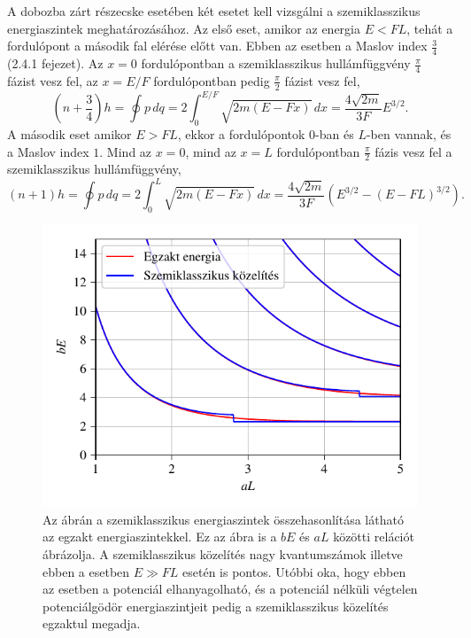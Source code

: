 A dobozba zárt részecske esetében két esetet kell vizsgálni a szemiklasszikus energiaszintek meghatározásához. Az első eset, amikor az energia $E < FL$, tehát a fordulópont a második fal elérése előtt van. Ebben az esetben a Maslov index $\frac{3}{4}$ \cite{brack:semiclassical} (2.4.1 fejezet). Az $x=0$ fordulópontban a szemiklasszikus hullámfüggvény $\frac{\pi}{4}$ fázist vesz fel, az $x=E/F$ fordulópontban pedig $\frac{\pi}{2}$ fázist vesz fel,
\begin{equation}
	\left(n+\frac{3}{4}\right)h=\oint p\,dq=2\int_0^{E/F}\sqrt{2m\left( E-Fx \right)}\,dx=\frac{4\sqrt{2m}}{3F}E^{3/2}.
	\label{semiclassicallevels:e1}
\end{equation}
A második eset amikor $E > FL$, ekkor a fordulópontok $0$-ban és $L$-ben vannak, és a Maslov index $1$. Mind az $x=0$, mind az $x=L$ fordulópontban $\frac{\pi}{2}$ fázis vesz fel a szemiklasszikus hullámfüggvény,
\begin{equation}
	\left(n+1\right)h=\oint p\,dq=2\int_0^{L}\sqrt{2m\left(E-Fx\right)}\,dx=\frac{4\sqrt{2m}}{3F}\left(E^{3/2}-\left(E-FL\right)^{3/2}\right).
	\label{semiclassicallevels:e2}
\end{equation}
\begin{figure}[H]
	\centering
	\includegraphics[scale=1]{./figs/energiaszintkozelites.pdf}
	\caption[Szemiklasszikus energiaszintek]{Az ábrán a szemiklasszikus energiaszintek összehasonlítása látható az egzakt energiaszintekkel. Ez az ábra is a $bE$ és $aL$ közötti relációt ábrázolja. A szemiklasszikus közelítés nagy kvantumszámok illetve ebben a esetben $E \gg FL$ esetén is pontos. Utóbbi oka, hogy ebben az esetben a potenciál elhanyagolható, és a potenciál nélküli végtelen potenciálgödör energiaszintjeit pedig a szemiklasszikus közelítés egzaktul megadja.}
	\label{semiclassicallevels:kozelites}
\end{figure}
